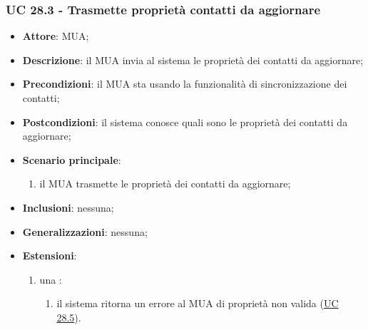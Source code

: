     \subsubsection{UC 28.3 - Trasmette proprietà contatti da aggiornare} \label{sec:UC28.3}
    \begin{itemize}
        \item \textbf{Attore}: MUA;
        \item \textbf{Descrizione}: il MUA invia al sistema le proprietà dei contatti da aggiornare;
        \item \textbf{Precondizioni}: il MUA sta usando la funzionalità di sincronizzazione dei contatti;
        \item \textbf{Postcondizioni}: il sistema conosce quali sono le proprietà dei contatti da aggiornare;
        \item \textbf{Scenario principale}:
            \begin{enumerate}
                \item il MUA trasmette le proprietà dei contatti da aggiornare;
            \end{enumerate}
        \item \textbf{Inclusioni}: nessuna;
        \item \textbf{Generalizzazioni}: nessuna;
        \item \textbf{Estensioni}:
            \begin{enumerate}[label=\alph*.]
                \item una :
                \begin{enumerate}[label=\arabic*.]
                    \item il sistema ritorna un errore al MUA di proprietà non valida (\hyperref[sec:UC28.5]{UC 28.5}).
                \end{enumerate}
            \end{enumerate}
    \end{itemize}


